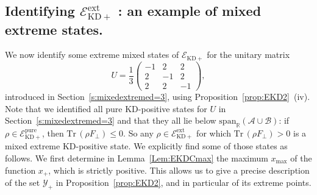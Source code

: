 \documentclass[a4paper, notitlepage, 11pt]{article}
\numberwithin{equation}{section}
\newcommand{\red}[1]{\textcolor{red}{#1}}
\newcommand{\Acal}{{\mathcal A}}
\newcommand{\Bcal}{{\mathcal B}}
\newcommand{\EcalKDC}{{\mathcal E}_{\mathrm{KD+}}}
\newcommand{\EcalKDCpu}{{\mathcal E}_{\mathrm{KD+}}^{\mathrm{pure}}}
\newcommand{\EcalKDCext}{{\mathcal E}_{\mathrm{KD+}}^{\mathrm{ext}}}
\newcommand{\spanRAB}{{\mathrm{span}_{\R}(\Acal\cup\Bcal)}}
\newcommand{\R}{\mathbb{R}}
\newcommand{\Tr}{\mathrm{Tr}\,}
\begin{document}
\subsection{Identifying $\EcalKDCext$ : an example of mixed extreme states.}\label{subs:KDCextmixed}

We now identify some extreme mixed states of $\EcalKDC$ for the unitary matrix 
\begin{equation}\label{eq:Uspecial}
U=\frac{1}{3}\begin{pmatrix}
-1 & 2 & 2 \\
2 & -1 & 2 \\
2 & 2 & -1
\end{pmatrix},
\end{equation}
introduced in Section~\ref{s:mixedextremed=3},  using Proposition~\ref{prop:EKD2}~(iv).
Note that we identified all pure KD-positive states for $U$ in Section~\ref{s:mixedextremed=3} and that they all lie below $\spanRAB$: if $\rho\in \EcalKDCpu$, then $\Tr(\rho F_\perp)\leq0$.  So any $\rho\in\EcalKDCext$ for which $\Tr(\rho F_\perp)>0$ is a mixed extreme KD-positive state. We explicitly find some of those states as follows. 
 We first determine in Lemma~\ref{Lem:EKDCmax} the maximum $x_{\max}$ of the function $x_{+}$, which is strictly positive. This allows us to give a precise description of  the set $\mathcal Y_+$ in Proposition~\ref{prop:EKD2}, and in particular of its extreme points.

\end{document}

